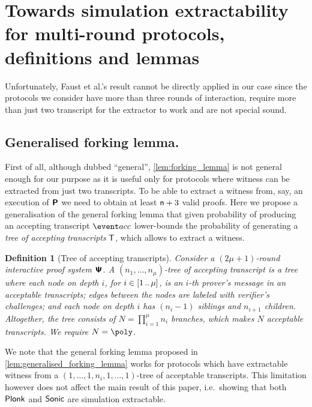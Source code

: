 \let\accentvec\vec \documentclass[runningheads,10pt]{llncs}
\newtheorem{definition}[theorem]{Definition}
\begin{document}
\section{Towards simulation extractability for multi-round
protocols, definitions and lemmas}
Unfortunately, Faust et al.'s result cannot be directly applied in our case
since the protocols we consider have more than three rounds of interaction,
require more than just two transcript for the extractor to work and are not special sound.

\subsection{Generalised forking lemma.}
First of all, although dubbed ``general'', \cref{lem:forking_lemma} is not
general enough for our purpose as it is useful only for protocols where witness
can be extracted from just two transcripts.  To be able to extract a witness
from, say, an execution of $\bm{\mathsf{P}}$ we need to obtain at least
$\mathsf{n} + 3$ valid proofs.  
Here we propose a generalisation of the general forking lemma that given
probability of producing an accepting transcript $\accProb$ lower-bounds the
probability of generating a \emph{tree of accepting transcripts} $\mathsf{T}$,
which allows to extract a witness. 

\begin{definition}[Tree of accepting transcripts]
	\label{def:tree_of_accepting_transcripts}
	Consider a $(2\mu + 1)$-round interactive proof system $\bm{\mathsf{\Psi}}$. A $(n_1,
	\ldots, n_\mu)$-tree of accepting transcript is a tree where each node on
	depth $i$, for $i \in [1 \, .. \, \mu]$, is an $i$-th prover's message in an
	acceptable transcripts; edges between the nodes are labeled with verifier's
	challenges; and each node on depth $i$ has $(n_{i} - 1)$ siblings and $n_{i + 1}$ children.
	Altogether, the tree consists of $N = \prod_{i = 1}^\mu n_i$ branches, which
	makes $N$ acceptable transcripts. We require $N = \poly$.
\end{definition}

We note that the general forking lemma proposed in
\cref{lem:generalised_forking_lemma} works for protocols which have
extractable witness from a $(1, \ldots, 1, n_i, 1, \ldots, 1)$-tree of
acceptable transcripts. This limitation however does not affect the main
result of this paper, i.e.~showing that both $\textnormal{\textsf{Plonk}}$ and ${\textnormal{\textsf{Sonic}}}$ are
simulation extractable. 
\end{document}
